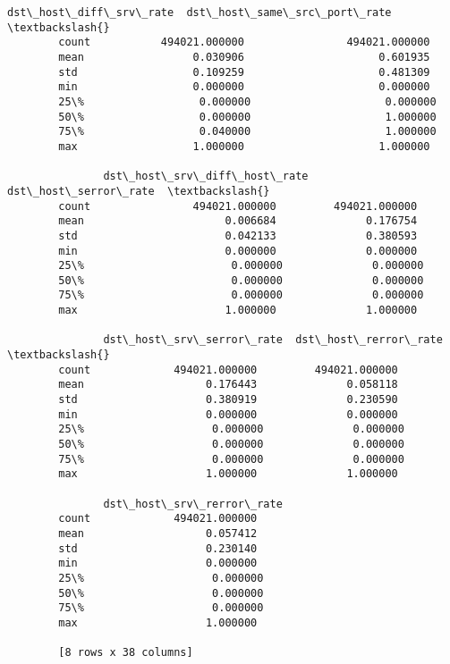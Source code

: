 \documentclass[11pt]{article}
\begin{document}
\begin{Verbatim}[commandchars=\\\{\}]
               dst\_host\_diff\_srv\_rate  dst\_host\_same\_src\_port\_rate  \textbackslash{}
        count           494021.000000                494021.000000   
        mean                 0.030906                     0.601935   
        std                  0.109259                     0.481309   
        min                  0.000000                     0.000000   
        25\%                  0.000000                     0.000000   
        50\%                  0.000000                     1.000000   
        75\%                  0.040000                     1.000000   
        max                  1.000000                     1.000000   
        
               dst\_host\_srv\_diff\_host\_rate  dst\_host\_serror\_rate  \textbackslash{}
        count                494021.000000         494021.000000   
        mean                      0.006684              0.176754   
        std                       0.042133              0.380593   
        min                       0.000000              0.000000   
        25\%                       0.000000              0.000000   
        50\%                       0.000000              0.000000   
        75\%                       0.000000              0.000000   
        max                       1.000000              1.000000   
        
               dst\_host\_srv\_serror\_rate  dst\_host\_rerror\_rate  \textbackslash{}
        count             494021.000000         494021.000000   
        mean                   0.176443              0.058118   
        std                    0.380919              0.230590   
        min                    0.000000              0.000000   
        25\%                    0.000000              0.000000   
        50\%                    0.000000              0.000000   
        75\%                    0.000000              0.000000   
        max                    1.000000              1.000000   
        
               dst\_host\_srv\_rerror\_rate  
        count             494021.000000  
        mean                   0.057412  
        std                    0.230140  
        min                    0.000000  
        25\%                    0.000000  
        50\%                    0.000000  
        75\%                    0.000000  
        max                    1.000000  
        
        [8 rows x 38 columns]
\end{Verbatim}
            
\end{document}
